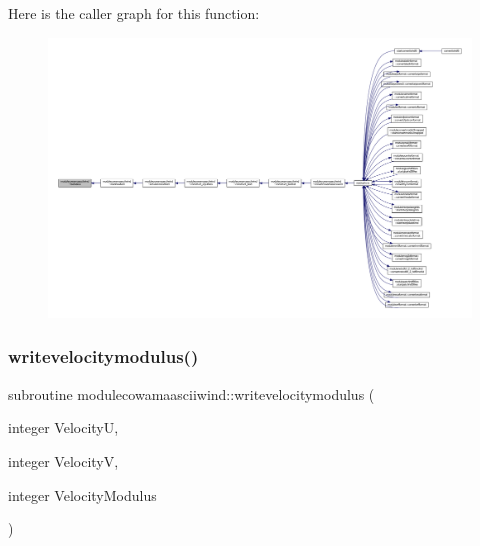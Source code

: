 Here is the caller graph for this function\+:\nopagebreak
\begin{figure}[H]
\begin{center}
\leavevmode
\includegraphics[width=350pt]{namespacemodulecowamaasciiwind_a3e1412f70915d204c75940a89c18a417_icgraph}
\end{center}
\end{figure}
\mbox{\label{namespacemodulecowamaasciiwind_af4f03b22c10470dbdcdaa2f8ab7713d9}} 
\subsubsection{\texorpdfstring{writevelocitymodulus()}{writevelocitymodulus()}}
{\footnotesize\ttfamily subroutine modulecowamaasciiwind\+::writevelocitymodulus (\begin{DoxyParamCaption}\item[{integer}]{VelocityU,  }\item[{integer}]{VelocityV,  }\item[{integer}]{Velocity\+Modulus }\end{DoxyParamCaption})\hspace{0.3cm}{\ttfamily [private]}}

